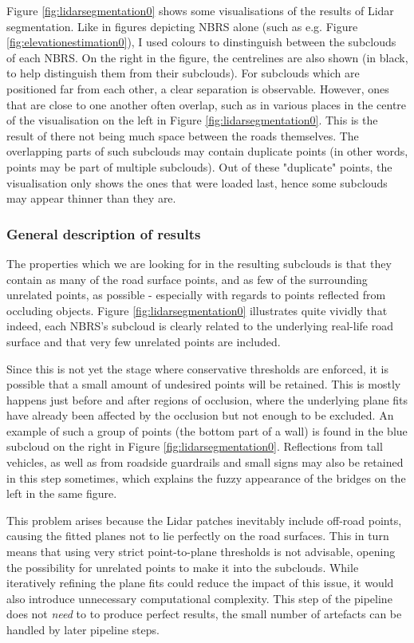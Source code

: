 Figure \ref{fig:lidarsegmentation0} shows some visualisations of the results of Lidar segmentation. Like in figures depicting NBRS alone (such as e.g. Figure \ref{fig:elevationestimation0}), I used colours to dinstinguish between the subclouds of each NBRS. On the right in the figure, the centrelines are also shown (in black, to help distinguish them from their subclouds). For subclouds which are positioned far from each other, a clear separation is observable. However, ones that are close to one another often overlap, such as in various places in the centre of the visualisation on the left in Figure \ref{fig:lidarsegmentation0}. This is the result of there not being much space between the roads themselves. The overlapping parts of such subclouds may contain duplicate points (in other words, points may be part of multiple subclouds). Out of these "duplicate" points, the visualisation only shows the ones that were loaded last, hence some subclouds may appear thinner than they are.

\subsubsection{General description of results}

The properties which we are looking for in the resulting subclouds is that they contain as many of the road surface points, and as few of the surrounding unrelated points, as possible - especially with regards to points reflected from occluding objects. Figure \ref{fig:lidarsegmentation0} illustrates quite vividly that indeed, each NBRS's subcloud is clearly related to the underlying real-life road surface and that very few unrelated points are included.

Since this is not yet the stage where conservative thresholds are enforced, it is possible that a small amount of undesired points will be retained. This is mostly happens just before and after regions of occlusion, where the underlying plane fits have already been affected by the occlusion but not enough to be excluded. An example of such a group of points (the bottom part of a wall) is found in the blue subcloud on the right in Figure \ref{fig:lidarsegmentation0}. Reflections from tall vehicles, as well as from roadside guardrails and small signs may also be retained in this step sometimes, which explains the fuzzy appearance of the bridges on the left in the same figure.

This problem arises because the Lidar patches inevitably include off-road points, causing the fitted planes not to lie perfectly on the road surfaces. This in turn means that using very strict point-to-plane thresholds is not advisable, opening the possibility for unrelated points to make it into the subclouds. While iteratively refining the plane fits could reduce the impact of this issue, it would also introduce unnecessary computational complexity. This step of the pipeline does not \textit{need} to to produce perfect results, the small number of artefacts can be handled by later pipeline steps. 

